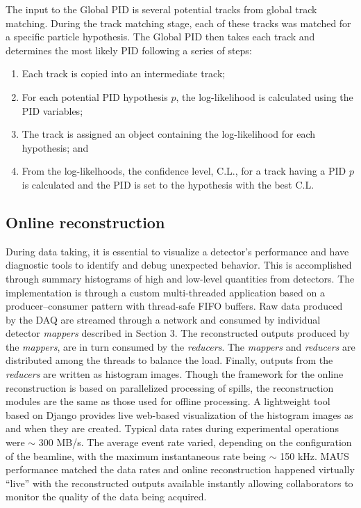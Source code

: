 \documentclass[11pt,a4paper]{article}
\begin{document}
The input to the Global PID is several potential tracks from global track matching. During the track matching stage, each of these tracks was matched for a specific particle hypothesis. The Global PID then takes each track and determines the most likely PID following a series of steps:

\begin{enumerate}
\item Each track is copied into an intermediate track;
\item For each potential PID hypothesis $p$, the log-likelihood is calculated using the PID variables;
\item The track is assigned an object containing the log-likelihood for each hypothesis; and
\item From the log-likelhoods, the confidence level, C.L., for a track having a PID $p$ is calculated and the PID is set to the hypothesis with the best C.L.
\end{enumerate}

\subsection{Online reconstruction} 

During data taking, it is essential to visualize a detector's performance and have diagnostic tools to identify and debug unexpected behavior. This is accomplished through summary histograms of  high and low-level quantities from detectors. The implementation is through a custom multi-threaded application based on a producer--consumer pattern with thread-safe FIFO buffers. Raw data produced by the DAQ are streamed through a network and consumed by individual detector \textit{mappers} described in Section 3. The reconstructed outputs produced by the \textit{mappers},  are in turn consumed by the \textit{reducers}. The \textit{mappers} and \textit{reducers} are distributed among the threads to balance the load. Finally,  outputs from the \textit{reducers} are written as histogram images. Though the framework for the online reconstruction is based on parallelized processing of spills, the reconstruction modules are the same as those used for offline processing. A lightweight tool based on Django \cite{Django} provides live web-based visualization of the histogram images as and when they are created. Typical data rates during experimental operations were $\sim$ 300 MB/s. The average event rate varied, depending on the configuration of the beamline, with the maximum instantaneous rate being $\sim$ 150 kHz. MAUS performance matched the data rates and  online reconstruction happened virtually ``live'' with the reconstructed outputs  available instantly allowing collaborators to monitor the quality of the data being acquired.
\end{document}
